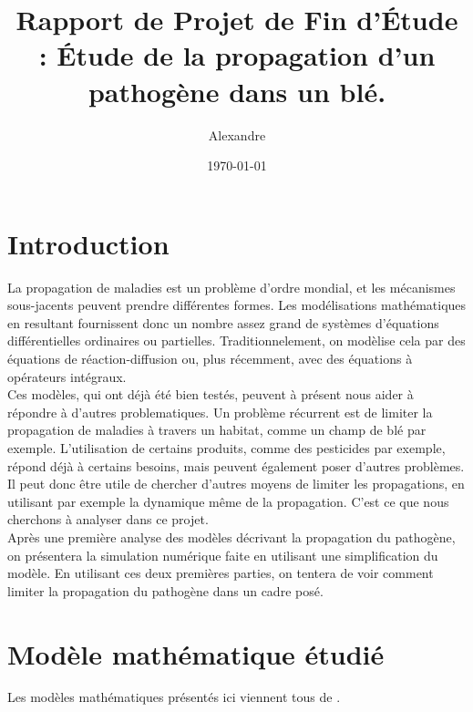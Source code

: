 \documentclass{article}
\title{Rapport de Projet de Fin d'Étude : Étude de la propagation d'un pathogène dans un blé.}
\author{Alexandre \bsc{Vieira}}
\date{\today}
\begin{document}
\maketitle
\tableofcontents

\newpage

\section*{Introduction}
La propagation de maladies est un problème d'ordre mondial, et les mécanismes sous-jacents peuvent prendre différentes formes. Les modélisations mathématiques en resultant fournissent donc un nombre assez grand de systèmes d'équations différentielles ordinaires ou partielles. Traditionnelement, on modèlise cela par des équations de réaction-diffusion ou, plus récemment, avec des équations à opérateurs intégraux.\\
Ces modèles, qui ont déjà été bien testés, peuvent à présent nous aider à répondre à d'autres problematiques. Un problème récurrent est de limiter la propagation de maladies à travers un habitat, comme un champ de blé par exemple. L'utilisation de certains produits, comme des pesticides par exemple, répond déjà à certains besoins, mais peuvent également poser d'autres problèmes. Il peut donc être utile de chercher d'autres moyens de limiter les propagations, en utilisant par exemple la dynamique même de la propagation. C'est ce que nous cherchons à analyser dans ce projet.\\
Après une première analyse des modèles décrivant la propagation du pathogène, on présentera la simulation numérique faite en utilisant une simplification du modèle. En utilisant ces deux premières parties, on tentera de voir comment limiter la propagation du pathogène dans un cadre posé.

\section{Modèle mathématique étudié}
Les modèles mathématiques présentés ici viennent tous de \cite{KotMedlock03}. 
\end{document}
